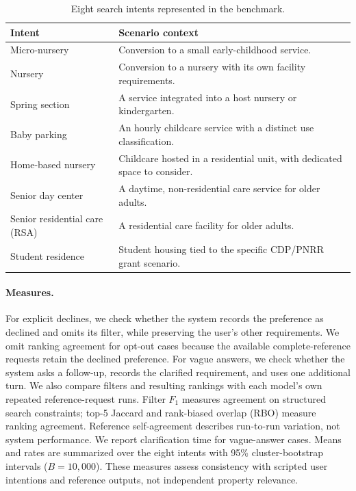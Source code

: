 \documentclass[sigconf,review]{acmart}
\begin{document}
\begin{table}[t]
\caption{Eight search intents represented in the benchmark.}
\label{tab:intents}
\centering\footnotesize\setlength{\tabcolsep}{3pt}
\begin{tabular*}{\columnwidth}{@{\extracolsep{\fill}}p{}p{}@{}}
\toprule
Intent & Scenario context \\
\midrule
Micro-nursery & Conversion to a small early-childhood service. \\
Nursery & Conversion to a nursery with its own facility requirements. \\
Spring section & A service integrated into a host nursery or kindergarten. \\
Baby parking & An hourly childcare service with a distinct use classification. \\
Home-based nursery & Childcare hosted in a residential unit, with dedicated space to consider. \\
Senior day center & A daytime, non-residential care service for older adults. \\
Senior residential care (RSA) & A residential care facility for older adults. \\
Student residence & Student housing tied to the specific CDP/PNRR grant scenario. \\
\bottomrule
\end{tabular*}
\end{table}


\paragraph{Measures.} For explicit declines, we check whether the system
records the preference as declined and omits its filter, while preserving
the user's other requirements. We omit ranking agreement for opt-out cases because the available complete-reference requests retain the declined preference. For vague answers, we check whether the system asks a follow-up,
records the clarified requirement, and uses one additional turn. We also
compare filters and resulting rankings with each model's own repeated
reference-request runs. Filter $F_1$ measures agreement on structured search
constraints; top-5 Jaccard and rank-biased overlap (RBO) measure ranking
agreement. Reference self-agreement describes run-to-run variation, not
system performance. We report clarification time for vague-answer cases.
Means and rates are summarized over the eight intents with 95\%
cluster-bootstrap intervals ($B=10{,}000$). These measures assess
consistency with scripted user intentions and reference outputs, not
independent property relevance.
\end{document}
